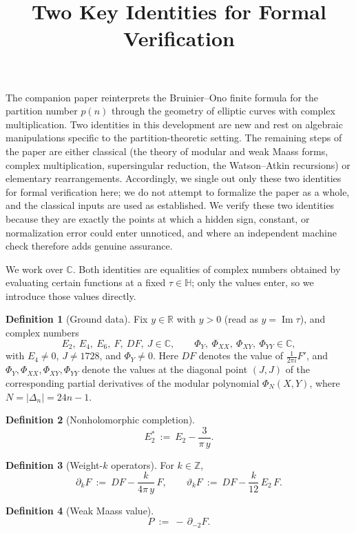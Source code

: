 \documentclass[11pt]{article}
\title{\bf Two Key Identities for Formal Verification}
\newcommand{\C}{\mathbb{C}}
\newcommand{\R}{\mathbb{R}}
\newcommand{\HH}{\mathbb{H}}
\theoremstyle{definition}
\newtheorem{defn}{Definition}
\begin{document}
\maketitle

The companion paper reinterprets the Bruinier--Ono finite formula for the partition
number $p(n)$ through the geometry of elliptic curves with complex multiplication. 
Two identities in this development are new and rest on algebraic manipulations specific to the
partition-theoretic setting. The remaining steps of the paper are either classical (the
theory of modular and weak Maass forms, complex multiplication, supersingular reduction, the
Watson--Atkin recursions) or elementary rearrangements. Accordingly, we single out only these
two identities for formal verification here; we do not attempt to formalize the paper as a
whole, and the classical inputs are used as established.
We verify these two identities because they are exactly the points at which a hidden sign,
constant, or normalization error could enter unnoticed, and where an independent machine check
therefore adds genuine assurance. 

We work over $\C$. Both identities are equalities of complex numbers obtained by evaluating
certain functions at a fixed $\tau\in\HH$; only the values enter, so we introduce those values
directly.

\begin{defn}[Ground data]
Fix $y\in\R$ with $y>0$ (read as $y=\operatorname{Im}\tau$), and complex numbers
\[
E_2,\ E_4,\ E_6,\ F,\ DF,\ J \in \C,
\qquad
\Phi_Y,\ \Phi_{XX},\ \Phi_{XY},\ \Phi_{YY} \in \C,
\]
with $E_4\neq0$, $J\neq1728$, and $\Phi_Y\neq0$. Here $DF$ denotes the value of
$\tfrac{1}{2\pi i}F'$, and $\Phi_Y,\Phi_{XX},\Phi_{XY},\Phi_{YY}$ denote the values at the
diagonal point $(J,J)$ of the corresponding partial derivatives of the modular polynomial
$\Phi_N(X,Y)$, where $N=|\Delta_n|=24n-1$.
\end{defn}

\begin{defn}[Nonholomorphic completion]
\[
E_2^{*}\ :=\ E_2-\frac{3}{\pi\,y}.
\]
\end{defn}

\begin{defn}[Weight-$k$ operators]
For $k\in\mathbb{Z}$,
\[
\partial_k F\ :=\ DF-\frac{k}{4\pi\,y}\,F,
\qquad
\vartheta_k F\ :=\ DF-\frac{k}{12}\,E_2\,F.
\]
\end{defn}

\begin{defn}[Weak Maass value]
\[
P\ :=\ -\,\partial_{-2}F.
\]
\end{defn}
\end{document}
